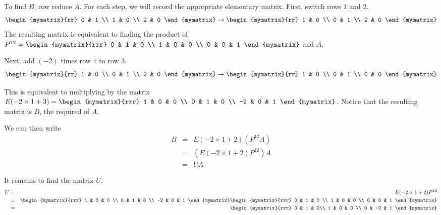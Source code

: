 \begin{solution}
To find $B$, row reduce $A$. For each step, we will record the appropriate elementary matrix. 
First, switch rows $1$ and $2$. 
\[
 \begin{mymatrix}{rr}
0 & 1 \\
1 & 0 \\
2 & 0
\end{mymatrix}
\rightarrow
\begin{mymatrix}{rr}
1 & 0 \\
0 & 1 \\
2 & 0
\end{mymatrix}
\]
The resulting matrix is equivalent to finding the product of 
$ P^{12} =\begin{mymatrix}{rrr}
0 & 1 & 0 \\
1 & 0 & 0 \\
0 & 0 & 1 
\end{mymatrix}$ and $A$. 

Next, add $(-2)$ times row $1$ to row $3$. 
\[
\begin{mymatrix}{rr}
1 & 0 \\
0 & 1 \\
2 & 0
\end{mymatrix}
\rightarrow
\begin{mymatrix}{rr}
1 & 0 \\
0 & 1 \\
0 & 0
\end{mymatrix}
\]

This is equivalent to multiplying by the matrix $E(-2 \times 1 + 3) = 
\begin{mymatrix}{rrr}
1 & 0 & 0 \\
0 & 1 & 0 \\
-2 & 0 & 1 
\end{mymatrix}$. Notice that the resulting matrix is $B$, the required {\rref} of $A$.

We can then write 
\begin{eqnarray*}
B &=& E(-2 \times 1 + 2) \left( P^{12} A \right) \\
&=& \left( E(-2 \times 1 + 2) P^{12} \right) A \\
&=& U A
\end{eqnarray*} 

It remains to find the matrix $U$. 
\begin{eqnarray*}
U &=& E(-2 \times 1 + 2) P^{12} \\
&=& \begin{mymatrix}{rrr}
1 & 0 & 0 \\
0 & 1 & 0 \\
-2 & 0 & 1 
\end{mymatrix}
\begin{mymatrix}{rrr}
0 & 1 & 0 \\
1 & 0 & 0 \\
0 & 0 & 1 
\end{mymatrix} \\
&=& \begin{mymatrix}{rrr}
0 & 1 & 0\\
1 & 0 & 0 \\
0 & -2  & 1 
\end{mymatrix}
\end{eqnarray*}



\end{solution}
